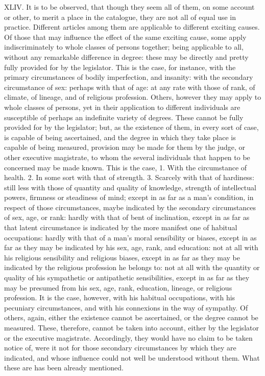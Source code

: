 \documentclass[12pt]{report}
\begin{document}
XLIV. It is to be observed, that though they seem all of them, on some
account or other, to merit a place in the catalogue, they are not all of
equal use in practice. Different articles among them are applicable to
different exciting causes. Of those that may influence the effect of the
same exciting cause, some apply indiscriminately to whole classes of
persons together; being applicable to all, without any remarkable
difference in degree: these may be directly and pretty fully provided
for by the legislator. This is the case, for instance, with the primary
circumstances of bodily imperfection, and insanity: with the secondary
circumstance of sex: perhaps with that of age: at any rate with those of
rank, of climate, of lineage, and of religious profession. Others,
however they may apply to whole classes of persons, yet in their
application to different individuals are susceptible of perhaps an
indefinite variety of degrees. These cannot be fully provided for by the
legislator; but, as the existence of them, in every sort of case, is
capable of being ascertained, and the degree in which they take place is
capable of being measured, provision may be made for them by the judge,
or other executive magistrate, to whom the several individuals that
happen to be concerned may be made known. This is the case, 1. With the
circumstance of health. 2. In some sort with that of strength. 3.
Scarcely with that of hardiness: still less with those of quantity and
quality of knowledge, strength of intellectual powers, firmness or
steadiness of mind; except in as far as a man's condition, in respect of
those circumstances, maybe indicated by the secondary circumstances of
sex, age, or rank: hardly with that of bent of inclination, except in as
far as that latent circumstance is indicated by the more manifest one of
habitual occupations: hardly with that of a man's moral sensibility or
biases, except in as far as they may be indicated by his sex, age, rank,
and education: not at all with his religious sensibility and religious
biases, except in as far as they may be indicated by the religious
profession he belongs to: not at all with the quantity or quality of his
sympathetic or antipathetic sensibilities, except in as far as they may
be presumed from his sex, age, rank, education, lineage, or religious
profession. It is the case, however, with his habitual occupations, with
his pecuniary circumstances, and with his connexions in the way of
sympathy. Of others, again, either the existence cannot be ascertained,
or the degree cannot be measured. These, therefore, cannot be taken into
account, either by the legislator or the executive magistrate.
Accordingly, they would have no claim to be taken notice of, were it not
for those secondary circumstances by which they are indicated, and whose
influence could not well be understood without them. What these are has
been already mentioned.
\end{document}
